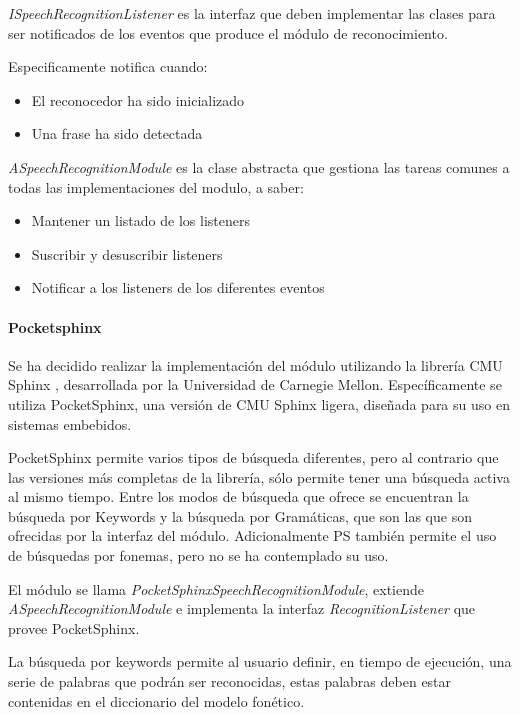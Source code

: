 \textit{ISpeechRecognitionListener} es la interfaz que deben implementar las clases para ser notificados de los eventos que produce el módulo de reconocimiento.

Especificamente notifica cuando:
\begin{itemize}
	\item El reconocedor ha sido inicializado
	\item Una frase ha sido detectada
\end{itemize}

   


\textit{ASpeechRecognitionModule} es la clase abstracta que gestiona las tareas comunes a todas las implementaciones del modulo, a saber:

\begin{itemize}
	\item Mantener un listado de los listeners
	\item Suscribir y desuscribir listeners
	\item Notificar a los listeners de los diferentes eventos
\end{itemize}





\paragraph*{Pocketsphinx\\}


Se ha decidido realizar la implementación del módulo utilizando la librería CMU Sphinx \cite{cmusphinx}, desarrollada por la Universidad de Carnegie Mellon.
Específicamente se utiliza PocketSphinx, una versión de CMU Sphinx ligera, diseñada para su uso en sistemas embebidos.

PocketSphinx permite varios tipos de búsqueda diferentes, pero al contrario que las versiones más completas de la librería, sólo permite tener una búsqueda activa al mismo tiempo.
Entre los modos de búsqueda que ofrece se encuentran la búsqueda por Keywords y la búsqueda por Gramáticas, que son las que son ofrecidas por la interfaz del módulo. Adicionalmente PS también permite el uso de búsquedas por fonemas, pero no se ha contemplado su uso.

El módulo se llama  \textit{PocketSphinxSpeechRecognitionModule}, extiende \textit{ASpeechRecognitionModule} e implementa la interfaz \textit{RecognitionListener} que provee PocketSphinx.

La búsqueda por keywords permite al usuario definir, en tiempo de ejecución, una serie de palabras que podrán ser reconocidas, estas palabras deben estar contenidas en el diccionario del modelo fonético.

